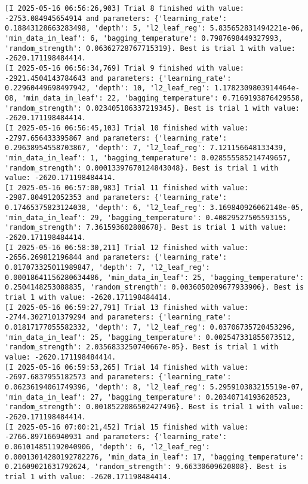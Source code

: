 \documentclass[
  letterpaper,
  DIV=11,
  numbers=noendperiod]{scrreprt}
\begin{document}
\begin{verbatim}
[I 2025-05-16 06:56:26,903] Trial 8 finished with value: -2753.084945654914 and parameters: {'learning_rate': 0.18843128663283498, 'depth': 5, 'l2_leaf_reg': 5.835652831494221e-06, 'min_data_in_leaf': 6, 'bagging_temperature': 0.7987698449327993, 'random_strength': 0.06362728767715319}. Best is trial 1 with value: -2620.171198484414.
[I 2025-05-16 06:56:34,769] Trial 9 finished with value: -2921.4504143784643 and parameters: {'learning_rate': 0.22960449698497942, 'depth': 10, 'l2_leaf_reg': 1.1782309803914464e-08, 'min_data_in_leaf': 22, 'bagging_temperature': 0.7169193876429558, 'random_strength': 0.023405106337219345}. Best is trial 1 with value: -2620.171198484414.
[I 2025-05-16 06:56:45,103] Trial 10 finished with value: -2797.656433395867 and parameters: {'learning_rate': 0.29638954558703867, 'depth': 7, 'l2_leaf_reg': 7.121156648133439, 'min_data_in_leaf': 1, 'bagging_temperature': 0.028555585214749657, 'random_strength': 0.00013397670124843048}. Best is trial 1 with value: -2620.171198484414.
[I 2025-05-16 06:57:00,983] Trial 11 finished with value: -2987.804912052353 and parameters: {'learning_rate': 0.17465375823124038, 'depth': 6, 'l2_leaf_reg': 3.169840926062148e-05, 'min_data_in_leaf': 29, 'bagging_temperature': 0.40829527505593155, 'random_strength': 7.361593602808678}. Best is trial 1 with value: -2620.171198484414.
[I 2025-05-16 06:58:30,211] Trial 12 finished with value: -2656.269812196844 and parameters: {'learning_rate': 0.017073325011989847, 'depth': 7, 'l2_leaf_reg': 0.00018641156280634486, 'min_data_in_leaf': 25, 'bagging_temperature': 0.2504148253088835, 'random_strength': 0.0036050209677933906}. Best is trial 1 with value: -2620.171198484414.
[I 2025-05-16 06:59:27,791] Trial 13 finished with value: -2744.3027101379294 and parameters: {'learning_rate': 0.01817177055582332, 'depth': 7, 'l2_leaf_reg': 0.03706735720453296, 'min_data_in_leaf': 25, 'bagging_temperature': 0.002547331855073512, 'random_strength': 2.0356833250740667e-05}. Best is trial 1 with value: -2620.171198484414.
[I 2025-05-16 06:59:53,265] Trial 14 finished with value: -2697.6837955182573 and parameters: {'learning_rate': 0.06236194061749396, 'depth': 8, 'l2_leaf_reg': 5.295910383215519e-07, 'min_data_in_leaf': 27, 'bagging_temperature': 0.20340714193628523, 'random_strength': 0.0018522086502427496}. Best is trial 1 with value: -2620.171198484414.
[I 2025-05-16 07:00:21,452] Trial 15 finished with value: -2766.897166940931 and parameters: {'learning_rate': 0.061014851192040906, 'depth': 6, 'l2_leaf_reg': 0.00013014280192782276, 'min_data_in_leaf': 17, 'bagging_temperature': 0.21609021631792624, 'random_strength': 9.66330609620808}. Best is trial 1 with value: -2620.171198484414.

\end{verbatim}
\end{document}
